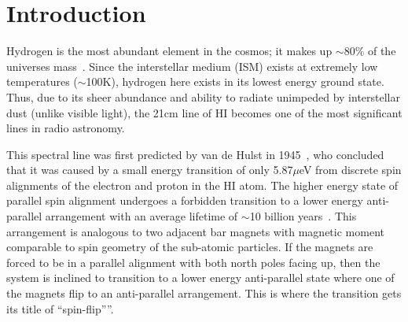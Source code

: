 \documentclass[prd, twocolumn, lengthcheck, superscriptaddress, showpacs, letterpaper, nofootinbib]{revtex4-1}
\begin{document}
\maketitle



\section{Introduction}
\label{sec:intro}

Hydrogen is the most abundant element in the cosmos; it makes up $\sim$80\% of the universe\textquotesingle s mass~\cite{5}. Since the interstellar medium (ISM) exists at extremely low temperatures ($\sim$100K), hydrogen here exists in its lowest energy ground state. Thus, due to its sheer abundance and ability to radiate unimpeded by interstellar dust (unlike visible light), the 21cm line of HI becomes one of the most significant lines in radio astronomy.

This spectral line was first predicted by van de Hulst in 1945~\cite{8}, who concluded that it was caused by a small energy transition of only 5.87$\mu$eV from discrete spin alignments of the electron and proton in the HI atom. The higher energy state of parallel spin alignment undergoes a forbidden transition to a lower energy anti-parallel arrangement with an average lifetime of $\sim$10 billion years~\cite{6}. This arrangement is analogous to two adjacent bar magnets with magnetic moment comparable to spin geometry of the sub-atomic particles. If the magnets are forced to be in a parallel alignment with both north poles facing up, then the system is inclined to transition to a lower energy anti-parallel state where one of the magnets flip to an anti-parallel arrangement. This is where the transition gets its title of \textquotedblleft spin-flip\textquotedblright”. 
\end{document}
